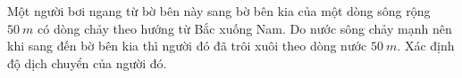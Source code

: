 \begin{ex}
	Một người bơi ngang từ bờ bên này sang bờ bên kia của một dòng sông rộng $\SI{50}{m}$ có dòng chảy theo hướng từ Bắc xuống Nam. Do nước sông chảy mạnh nên khi sang đến bờ bên kia thì người đó đã trôi xuôi theo dòng nước $\SI{50}{m}$. Xác định độ dịch chuyển của người đó.
\end{ex}



